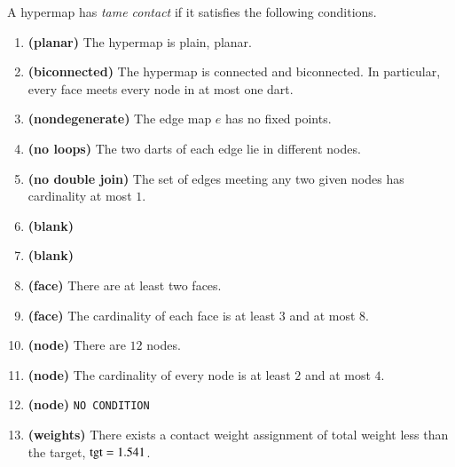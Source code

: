 A hypermap has {\it tame contact\/} if it satisfies the following
conditions.
%
%
\begin{enumerate}
    \item {\bf (planar)} The hypermap is plain, planar.
    \item {\bf (biconnected)} The hypermap is connected and biconnected.  In particular, every face meets every node in at most one dart.
    \item {\bf (nondegenerate)} The edge map $e$ has no fixed points.
    \item {\bf (no loops)} The two darts of each edge lie in different nodes.
    \item {\bf (no double join)} The set of edges meeting any two given nodes has cardinality at most $1$.
      \item{\bf (blank)}
    \item {\bf (blank)}
  \item {\bf (face)} There are at least two faces.
    \item {\bf (face)} The cardinality of each face is at least $3$ and at most $8$.
    \item {\bf (node)} There are $12$ nodes.
    \item {\bf (node)} The cardinality of every node is at least $2$ and at most    $4$.
    \item {\bf (node)} {\tt NO CONDITION}
    \item {\bf (weights)} There exists a contact weight assignment
        of total weight less than the target, ${\operatorname{tgt}}=1.541$.
\end{enumerate}
%

